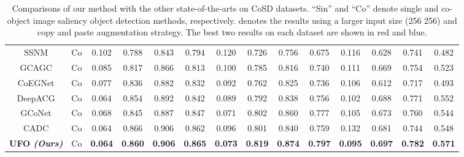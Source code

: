 \documentclass[journal]{IEEEtran}
\begin{document}
\begin{table*}[htb!]
\begin{center}
{\begin{tabular}{c|c|cccc|cccc|cccc}
				SSNM\cite{zhang2020deep}& Co  &  0.102 & 0.788 & 0.843 & 0.794  & 0.120 & 0.726 & 0.756 & 0.675 & 0.116 & 0.628 & 0.741 & 0.482 \\
				
				GCAGC\cite{zhang2020adaptive}& Co  &  0.085 & 0.817 & 0.866 & 0.813  & 0.100 & 0.785 & 0.816 & 0.740 & 0.111 & 0.669 & 0.754 & 0.523 \\
				
				
				CoEGNet\cite{fan2021re}& Co  & 0.077 & 0.836 & 0.882 & 0.832  & 0.092 & 0.762 & 0.825 & 0.736 &  0.106 & 0.612 & 0.717 & 0.493\\
				
				DeepACG\cite{zhang2021deepacg}& Co  &  {\color{red}0.064} & 0.854 & {\color{blue}0.892} & 0.842  & 0.089 & 0.792 & 0.838 & 0.756 & {\color{blue}0.102} & {\color{blue}0.688} & {\color{blue}0.771} & {\color{blue}0.552} \\
				
				GCoNet\cite{fan2021group}& Co  &  {\color{blue}0.068} & 0.845 & 0.887 & 0.847  & {\color{red}0.071} & {\color{blue}0.802} & {\color{blue}0.860} & {\color{blue}0.777} & 0.105 & 0.673 & 0.760 & 0.544 \\
				
				CADC\cite{zhang2021summarize}& Co  &  {\color{red}0.064} & {\color{red}0.866} & {\color{red}0.906} & {\color{blue}0.862}  & 0.096 & 0.801 & 0.840 & 0.759 & 0.132 & 0.681 & 0.744 & 0.548 \\
				


				\midrule  \textbf{UFO \textit{(Ours)}} & Co & \textbf{{\color{red}0.064}} & \textbf{{\color{blue}0.860}} & \textbf{{\color{red}0.906}} & \textbf{{\color{red}0.865}}  & \textbf{{\color{blue}0.073}} & \textbf{{\color{red}0.819}} & \textbf{{\color{red}0.874}} & \textbf{{\color{red}0.797}}  & \textbf{{\color{red}0.095}} & \textbf{{\color{red}0.697}} & \textbf{{\color{red}0.782}} & \textbf{{\color{red}0.571}} \\
				\bottomrule \end{tabular}}    
	\end{center}\caption{Comparisons of our method with the other state-of-the-arts on CoSD datasets. “Sin” and “Co” denote single and co-object image saliency object detection methods, respectively.  denotes the results using a larger input size (256  256) and copy and paste augmentation strategy. The best two results on each dataset are shown in {\color{red} red} and {\color{blue} blue}.}\label{table7}
\end{table*}
\end{document}

